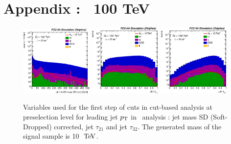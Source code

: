 \clearpage
\newpage

\section{Appendix : \zptt\ 100 TeV}
\label{appendix:zptt100}


\begin{figure}[!htb]\centering
\includegraphics[width=0.32\textwidth]{Fig/Zptt/Jet1_trk02_SD_Cor_m_sel0_nostack_log.eps}
\includegraphics[width=0.32\textwidth]{Fig/Zptt/Jet1_tau21_sel0_nostack_log.eps}
\includegraphics[width=0.32\textwidth]{Fig/Zptt/Jet1_tau32_sel0_nostack_log.eps}
\caption{Variables used for the first step of cuts in cut-based analysis at preselection level for leading jet $p\sb{\scriptstyle\mathrm{T}}$ in \zptt\ analysis : jet mass SD (Soft-Dropped) corrected, jet $\tau_{21}$ and jet $\tau_{32}$. The generated mass of the signal sample is 10 $\TeV$.}
\label{fig:Zptt_sel0_cut}
\end{figure}

